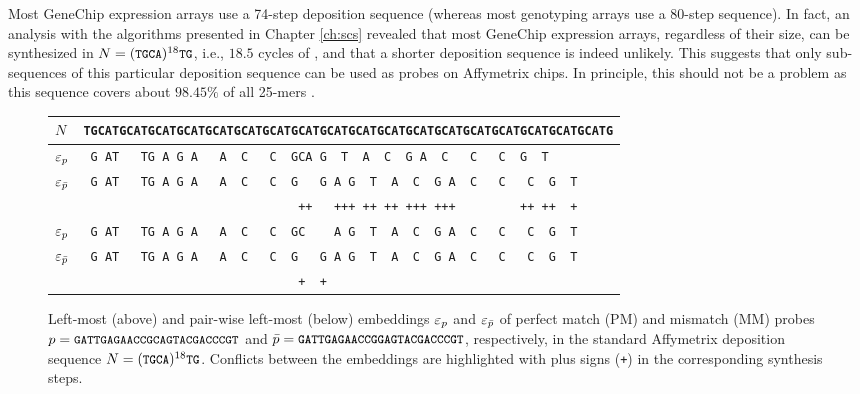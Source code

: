 Most GeneChip expression arrays use a 74-step deposition sequence (whereas most
genotyping arrays use a 80-step sequence). In fact, an analysis with the
algorithms presented in Chapter \ref{ch:scs} revealed that most GeneChip
expression arrays, regardless of their size, can be synthesized in
$N=({\text{\small{\tt{TGCA}}}})^{18}{\text{\small{\tt{TG}}}}$, i.e., $18.5$ cycles of , and that a
shorter deposition sequence is indeed unlikely. This suggests that only
sub-sequences of this particular deposition sequence can be used as probes on
Affymetrix chips. In principle, this should not be a problem as this sequence
covers about $98.45\%$ of all 25-mers \citep{Rahmann2006}.

\begin{figure}[t]\centering
\begin{tabular}{lc}
$N$              & \footnotesize{\tt{\verb|TGCATGCATGCATGCATGCATGCATGCATGCATGCATGCATGCATGCATGCATGCATGCATGCATGCATGCATG|}} \\
\hline
$\varepsilon_p$         & \footnotesize{\tt{\verb| G AT   TG A G A   A  C   C  GCA G  T  A  C  G A  C   C   C  G  T         |}} \\
$\varepsilon_{\bar{p}}$ & \footnotesize{\tt{\verb| G AT   TG A G A   A  C   C  G   G A G  T  A  C  G A  C   C   C  G  T     |}} \\
                 & \footnotesize{\tt{\verb|                              ++   +++ ++ ++ +++ +++         ++ ++  +     |}} \\
\hline
$\varepsilon_p$         & \footnotesize{\tt{\verb| G AT   TG A G A   A  C   C  GC    A G  T  A  C  G A  C   C   C  G  T     |}} \\
$\varepsilon_{\bar{p}}$ & \footnotesize{\tt{\verb| G AT   TG A G A   A  C   C  G   G A G  T  A  C  G A  C   C   C  G  T     |}} \\
                 & \footnotesize{\tt{\verb|                              +  +                                        |}} \\
\hline
\end{tabular}
\caption{\label{fig:pairwise_leftmost}%
  Left-most (above) and pair-wise left-most (below) embeddings $\varepsilon_p$ and
  $\varepsilon_{\bar{p}}$ of perfect match (PM) and mismatch (MM) probes
  $p={\text{\small{\tt{GATTGAGAACCGCAGTACGACCCGT}}}}$ and
  $\bar{p}={\text{\small{\tt{GATTGAGAACCGGAGTACGACCCGT}}}}$, respectively, in the standard
  Affymetrix deposition sequence $N=({\text{\small{\tt{TGCA}}}})^{18}{\text{\small{\tt{TG}}}}$. Conflicts
  between the embeddings are highlighted with plus signs (\small{\tt{+}})
  in the corresponding synthesis steps.}
\end{figure}

